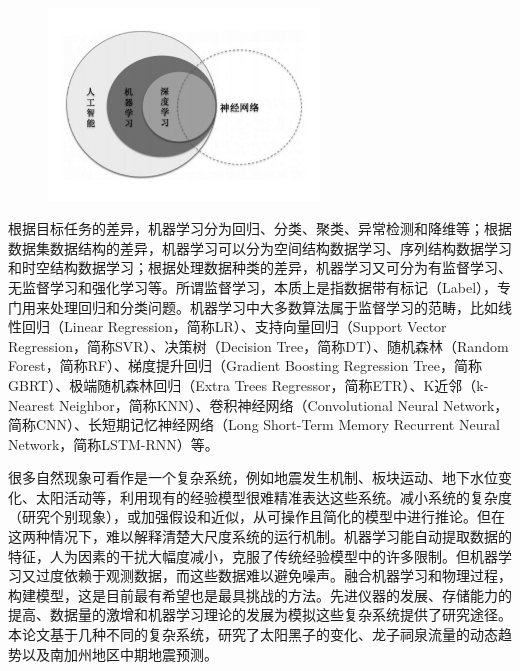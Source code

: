 \begin{figure}[!htbp]
  \centering
  \noindent\includegraphics[width=72mm]{Img/chap1_intro/AI_ML.pdf}
  \vspace{-0.6cm}
  \label{fig:intro_AI_ML}
\end{figure}

根据目标任务的差异，机器学习分为回归、分类、聚类、异常检测和降维等\citep{gomez2015multimodal,camps2013advances,gislason2006random,muhlbauer2014climatology}；根据数据集数据结构的差异，机器学习可以分为空间结构数据学习、序列结构数据学习和时空结构数据学习；根据处理数据种类的差异，机器学习又可分为有监督学习、无监督学习和强化学习等。所谓监督学习，本质上是指数据带有标记（Label），专门用来处理回归和分类问题。机器学习中大多数算法属于监督学习的范畴，比如线性回归（Linear Regression，简称LR）、支持向量回归（Support Vector Regression，简称SVR）、决策树（Decision Tree，简称DT）、随机森林（Random Forest，简称RF）、梯度提升回归（Gradient Boosting Regression Tree，简称GBRT）、极端随机森林回归（Extra Trees Regressor，简称ETR）、K近邻（k-Nearest Neighbor，简称KNN）、卷积神经网络（Convolutional Neural Network，简称CNN）、长短期记忆神经网络（Long Short-Term Memory Recurrent Neural Network，简称LSTM-RNN）等。

很多自然现象可看作是一个复杂系统，例如地震发生机制、板块运动、地下水位变化、太阳活动等，利用现有的经验模型很难精准表达这些系统。减小系统的复杂度（研究个别现象），或加强假设和近似，从可操作且简化的模型中进行推论。但在这两种情况下，难以解释清楚大尺度系统的运行机制。机器学习能自动提取数据的特征，人为因素的干扰大幅度减小，克服了传统经验模型中的许多限制。但机器学习又过度依赖于观测数据，而这些数据难以避免噪声。融合机器学习和物理过程，构建模型，这是目前最有希望也是最具挑战的方法。先进仪器的发展、存储能力的提高、数据量的激增和机器学习理论的发展为模拟这些复杂系统提供了研究途径。本论文基于几种不同的复杂系统，研究了太阳黑子的变化、龙子祠泉流量的动态趋势以及南加州地区中期地震预测。

